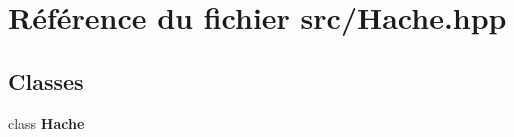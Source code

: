 \section{Référence du fichier src/\-Hache.hpp}
\label{_hache_8hpp}
\subsection*{Classes}
\begin{DoxyCompactItemize}
\item 
class {\bf Hache}
\end{DoxyCompactItemize}
